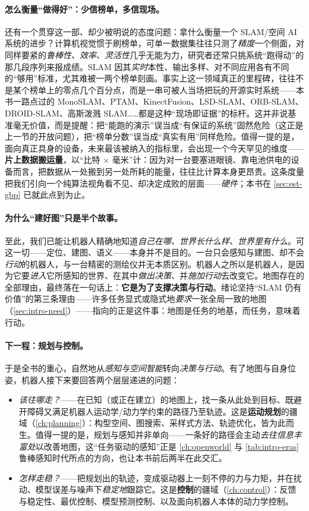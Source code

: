 \paragraph{怎么衡量“做得好”：少信榜单，多信现场。}
还有一个贯穿这一部、却少被明说的态度问题：拿什么衡量一个 SLAM/空间 AI 系统的进步？计算机视觉惯于刷榜单，可单一数据集往往只测了\emph{精度}一个侧面，对同样要紧的\emph{鲁棒性、效率、灵活性}几乎无能为力，研究者还常只挑系统“跑得动”的那几段序列来报成绩\cite{davison2026computational}。SLAM 因其\emph{实时}本性、输出多样、对不同应用各有不同的“够用”标准，尤其难被一两个榜单刻画。事实上这一领域真正的里程碑，往往不是某个榜单上的零点几个百分点，而是一串可被人当场把玩的开源实时系统——本书一路点过的 MonoSLAM、PTAM、KinectFusion、LSD-SLAM、ORB-SLAM、DROID-SLAM、高斯泼溅 SLAM……都是这种“现场即证据”的标杆。这并非说基准毫无价值，而是提醒：把“能跑的演示”误当成“有保证的系统”固然危险（这正是上一节的开放问题），把“榜单分数”误当成“真实有用”同样危险。值得一提的是，面向真正具身的设备，未来最该被纳入的指标里，会出现一个今天罕见的维度——\textbf{片上数据搬运量}，以“比特 $\times$ 毫米”计：因为对一台要塞进眼镜、靠电池供电的设备而言，把数据从一处搬到另一处所耗的能量，往往比计算本身更昂贵。这条度量把我们引向一个纯算法视角看不见、却决定成败的层面——\emph{硬件}；本书在 \cref{sec:est-gbp} 已就此点到为止。

\paragraph{为什么“建好图”只是半个故事。}
至此，我们已能让机器人精确地知道\emph{自己在哪、世界长什么样、世界里有什么}。可这一切——定位、建图、语义——本身并不是目的。一台只会感知与建图、却不会\emph{行动}的机器人，与一台精密的测绘仪并无本质区别。机器人之所以是机器人，是因为它要\emph{进入}它所感知的世界、在其中\emph{做出决策}、并\emph{施加行动}去改变它。地图存在的全部理由，最终落在一句话上：\textbf{它是为了支撑决策与行动}。绪论坚持“SLAM 仍有价值”的第三条理由——许多任务显式或隐式地\emph{要求}一张全局一致的地图（\cref{sec:intro-need}）——指向的正是这件事：地图是任务的地基，而任务，意味着行动。

\paragraph{下一程：规划与控制。}
于是全书的重心，自然地从\emph{感知与空间智能}转向\emph{决策与行动}。有了地图与自身位姿，机器人接下来要回答两个层层递进的问题：

\begin{itemize}
  \item \emph{该往哪走？}——在已知（或正在建立）的地图上，找一条从此处到目标、既避开障碍又满足机器人运动学/动力学约束的路径乃至轨迹。这是\textbf{运动规划}的疆域（\cref{ch:planning}）：构型空间、图搜索、采样式方法、轨迹优化，皆为此而生。值得一提的是，规划与感知并非单向——一条好的路径会主动\emph{去往信息丰富处}以改善地图，这“任务驱动的感知”正是 \cref{ch:openworld} 与 \cref{tab:intro-eras} 鲁棒感知时代所点的方向，也让本书前后两半在此交汇。
  \item \emph{怎样走稳？}——把规划出的轨迹，变成驱动器上一刻不停的力与力矩，并在扰动、模型误差与噪声下\emph{稳定地}跟踪它。这是\textbf{控制}的疆域（\cref{ch:control}）：反馈与稳定性、最优控制、模型预测控制、以及面向机器人本体的动力学控制。
\end{itemize}

